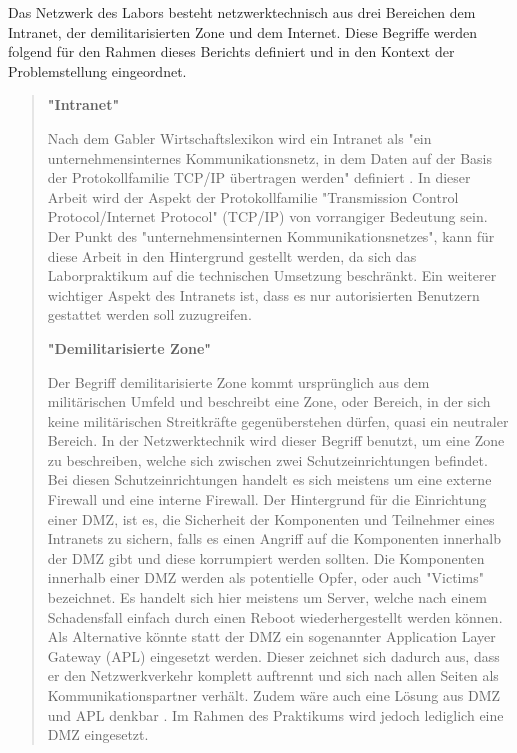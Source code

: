 \documentclass[
a4paper,     %
 headsepline, %
footsepline, %
titlepage,   %
 halfparskip,     %
 fleqn,       %
12pt         %
]{scrartcl}  %
\begin{document}
Das Netzwerk des Labors besteht netzwerktechnisch aus drei Bereichen dem Intranet, der demilitarisierten Zone und dem Internet. 
Diese Begriffe werden folgend für den Rahmen dieses Berichts definiert und in den Kontext der Problemstellung eingeordnet.
\begin{quotation}
\item[\textbf{"Intranet"}]

Nach dem Gabler Wirtschaftslexikon wird ein Intranet als "ein unternehmensinternes Kommunikationsnetz, in dem Daten auf der Basis der Protokollfamilie TCP/IP übertragen werden" definiert \cite{intra-1}. In dieser Arbeit wird der Aspekt der Protokollfamilie "Transmission Control Protocol/Internet Protocol" (TCP/IP) von vorrangiger Bedeutung sein. Der Punkt des "unternehmensinternen Kommunikationsnetzes"\cite{intra-1}, kann für diese Arbeit in den Hintergrund gestellt werden, da sich das Laborpraktikum auf die technischen Umsetzung beschränkt. 
Ein weiterer wichtiger Aspekt des Intranets ist, dass es nur autorisierten Benutzern gestattet werden soll zuzugreifen.  

\item[\textbf{"Demilitarisierte Zone"}]

Der Begriff demilitarisierte Zone kommt ursprünglich aus dem militärischen Umfeld und beschreibt eine Zone, oder Bereich, in der sich keine militärischen Streitkräfte gegenüberstehen dürfen, quasi ein neutraler Bereich. 
In der Netzwerktechnik wird dieser Begriff benutzt, um eine Zone zu beschreiben, welche sich zwischen zwei Schutzeinrichtungen befindet. Bei diesen Schutzeinrichtungen handelt es sich meistens um eine externe Firewall und eine interne Firewall. Der Hintergrund für die Einrichtung einer DMZ, ist es, die Sicherheit der Komponenten und Teilnehmer eines Intranets zu sichern, falls es einen Angriff auf die Komponenten innerhalb der DMZ gibt und diese korrumpiert werden sollten. Die Komponenten innerhalb einer DMZ werden als potentielle Opfer, oder auch "Victims" bezeichnet. Es handelt sich hier meistens um Server, welche nach einem Schadensfall einfach durch einen Reboot wiederhergestellt werden können. 
Als Alternative könnte statt der DMZ ein sogenannter Application Layer Gateway (APL) eingesetzt werden. Dieser zeichnet sich dadurch aus, dass er den Netzwerkverkehr komplett auftrennt und sich nach allen Seiten als Kommunikationspartner verhält. Zudem wäre auch eine Lösung aus DMZ und APL denkbar \cite{intra1}. Im Rahmen des Praktikums wird jedoch lediglich eine DMZ eingesetzt.


\end{quotation}
\end{document}
